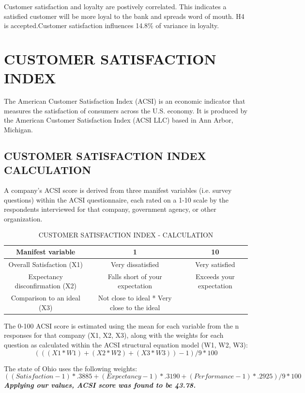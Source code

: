 \documentclass[a4paper, 14pt]{extarticle}
\begin{document}
{Customer satisfaction and loyalty are postively correlated. This indicates a satisfied customer will be more loyal to the bank and spreads word of mouth. H4 is accepted.Customer satisfaction influences 14.8\% of variance in loyalty.

\section{CUSTOMER SATISFACTION INDEX}
The American Customer Satisfaction Index (ACSI) is an economic indicator that measures the satisfaction of consumers across the U.S. economy. It is produced by the American Customer Satisfaction Index (ACSI LLC) based in Ann Arbor, Michigan.

\subsection{CUSTOMER SATISFACTION INDEX CALCULATION}
A company's ACSI score is derived from three manifest variables (i.e. survey questions) within the ACSI questionnaire, each rated on a 1-10 scale by the respondents interviewed for that company, government agency, or other organization.

\begin{table}[H]
\begin{tabular}{|c|c|c|}
\hline
Manifest variable & 1 & 10 \\
\hline
Overall Satisfaction (X1) & Very dissatisfied & Very satisfied \\
\hline
Expectancy disconfirmation (X2) & Falls short of your expectation & Exceeds your expectation \\
\hline
Comparison to an ideal (X3) & Not close to ideal * Very close to the ideal\\
\hline
\end{tabular}
\caption{CUSTOMER SATISFACTION INDEX - CALCULATION}
\end{table}
The 0-100 ACSI score is estimated using the mean for each variable from the n responses for that company (X1, X2, X3), along with the weights for each question as calculated within the ACSI structural equation model (W1, W2, W3):\\ 
\[ (((X1*W1)+(X2*W2)+(X3*W3))-1)/9*100 \]
\par The state of Ohio uses the following weights: \\
\[ ((Satisfaction-1)*.3885 + (Expectancy-1)*.3190 + (Performance-1)*.2925) / 9 * 100 \]
\textbf{\emph{Applying our values, ACSI score was found to be 43.78.}}

}
\end{document}
